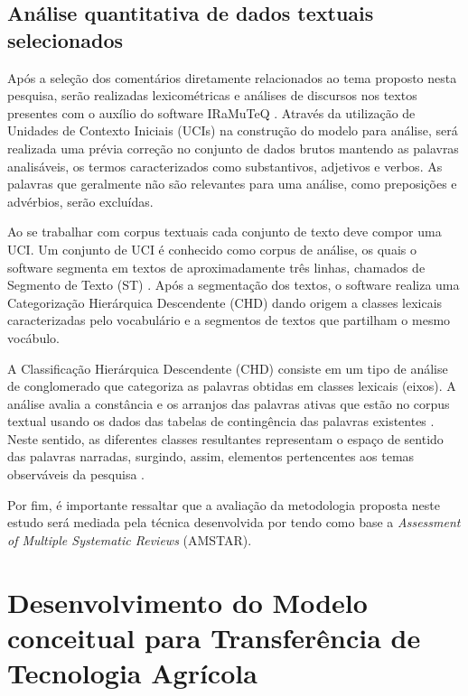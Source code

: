 \subsection{Análise quantitativa de dados textuais selecionados}

Após a seleção dos comentários diretamente relacionados ao tema proposto nesta pesquisa, serão realizadas lexicométricas e análises de discursos nos textos presentes com o auxílio do software IRaMuTeQ \cite{conde_lexicometria_2015,da_silva_cezar_panorama_2018}. Através da utilização de Unidades de Contexto Iniciais (UCIs) na construção do modelo para análise, será realizada uma prévia correção no conjunto de dados brutos mantendo as palavras analisáveis, os termos caracterizados como substantivos, adjetivos e verbos. As palavras que geralmente não são relevantes para uma análise, como preposições e advérbios, serão excluídas.

Ao se trabalhar com corpus textuais cada conjunto de texto deve compor uma UCI. Um conjunto de UCI é conhecido como corpus de análise, os quais o software segmenta em textos de aproximadamente três linhas, chamados de Segmento de Texto (ST) \cite{Fernandes2018AvaliacaoNatal/RN}. Após a segmentação dos textos, o software realiza uma Categorização Hierárquica Descendente (CHD) dando origem a classes lexicais caracterizadas pelo vocabulário e a segmentos de textos que partilham o mesmo vocábulo.

A Classificação Hierárquica Descendente (CHD) consiste em um tipo de análise de conglomerado que categoriza as palavras obtidas em classes lexicais (eixos). A análise avalia a constância e os arranjos das palavras ativas que estão no corpus textual usando os dados das tabelas de contingência das palavras existentes \cite{Carvalho2020UtilizacaoSanitaria,Mendes2019MappingAnalysis}. Neste sentido, as diferentes classes resultantes representam o espaço de sentido das palavras narradas, surgindo, assim, elementos pertencentes aos temas observáveis da pesquisa \cite{Gavasso2016RevisaoTreinamento}. 

Por fim, é importante ressaltar que a avaliação da metodologia proposta neste estudo será mediada pela técnica desenvolvida por  tendo como base a \textit{Assessment of Multiple Systematic Reviews} (AMSTAR).


\section{Desenvolvimento do Modelo conceitual para Transferência de Tecnologia Agrícola}

